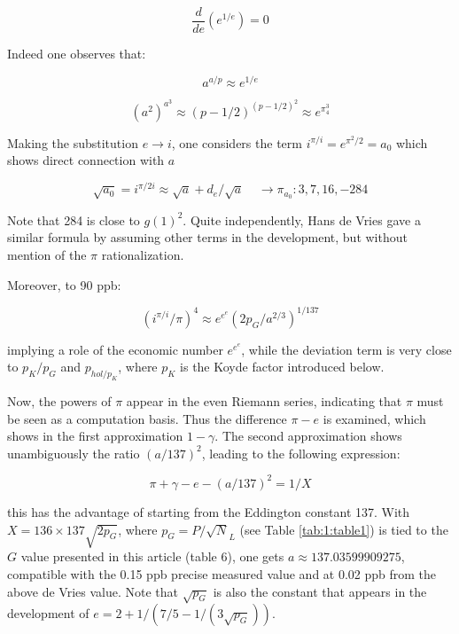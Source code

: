 \documentclass[a4paper,9pt]{article}
\begin{document}
\begin{equation}
\frac{d}{de}(e^{1/e}) = 0 
\end{equation}

   Indeed one observes that:
   
 \begin{equation}
 a^{a/p} \approx e^{1/e} 
 \end{equation}
 
 \begin{equation}
 (a^2)^{a^3} \approx (p-1/2)^{(p-1/2)^2} \approx e^{\pi_4^3}
\end{equation}

Making the substitution $e \to i$, one considers the term $i^{\pi/i} = e^{\pi^2/2} = a_0$ which shows direct connection with $a$
   
\begin{equation}
\sqrt{a_0} = i^{\pi/2i} \approx \sqrt a + d_e/ \sqrt a ~~~~~\rightarrow \pi_{a_0} : 3, 7, 16, -284
\end{equation}
 
Note that 284 is close to $g(1)^2$. Quite independently, Hans de Vries \cite{deVries} gave a similar formula by assuming other terms in the development, but without mention of the $\pi$ rationalization.

Moreover, to 90 ppb:

\begin{equation}
(i^{\pi/i}/\pi)^4 \approx e^{e^e} (2p_G/a^{2/3})^{1/137}
\end{equation}

implying a role of the economic number $e^{e^e}$, while the deviation term is very close to $p_K/p_G$ and $p_{hol/p_K}$, where $p_K$ is the Koyde factor introduced below.

Now, the powers of $\pi $ appear in the even Riemann series, indicating that $\pi$ must be seen as a computation basis. Thus the difference $\pi - e$ is examined, which shows in the first approximation $ 1-\gamma$. The second approximation shows unambiguously the ratio $(a/137)^2$, leading to the following expression:

     
\begin{equation}
\pi+ \gamma - e - (a/137)^2 = 1/X
\end{equation}    

this has the advantage of starting from the Eddington constant  137. With $X = 136 \times 137 \sqrt{2p_G}$, where $p_G = P/\sqrt N_L$ (see Table \ref{tab:1:table1}) is tied to the $G$ value presented in this article (table 6), one gets $a \approx 137.03599909275 $, compatible with the 0.15 ppb precise measured value and at 0.02 ppb from the above de Vries value. Note that $\sqrt {p_G} $ is also the constant that appears in the development of $e = 2 + 1/(7/5 -1/(3\sqrt {p_G}))$.
\end{document}
